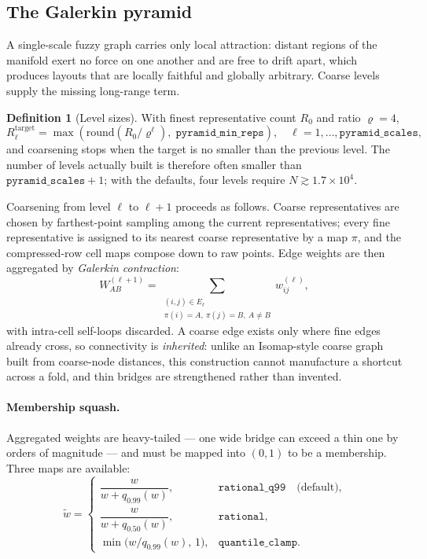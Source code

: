 \documentclass[12pt]{iopart}
\theoremstyle{definition}
\newtheorem{definition}{Definition}
\theoremstyle{plain}
\theoremstyle{remark}
\newcommand{\code}[1]{\texttt{#1}}
\begin{document}
\subsection{The Galerkin pyramid}
\label{sec:pyramid}

A single-scale fuzzy graph carries only local attraction: distant regions of the
manifold exert no force on one another and are free to drift apart, which
produces layouts that are locally faithful and globally arbitrary. Coarse
levels supply the missing long-range term.

\begin{definition}[Level sizes]
With finest representative count $R_0$ and ratio $\varrho=4$,
\[
R_\ell^{\mathrm{target}}
=
\max\!\left(\mathrm{round}\!\left(R_0/\varrho^{\ell}\right),\;
\code{pyramid\_min\_reps}\right),
\quad \ell=1,\ldots,\code{pyramid\_scales},
\]
and coarsening stops when the target is no smaller than the previous level. The
number of levels actually built is therefore often smaller than
$\code{pyramid\_scales}+1$; with the defaults, four levels require
$N\gtrsim 1.7\times 10^4$.
\end{definition}

Coarsening from level $\ell$ to $\ell{+}1$ proceeds as follows. Coarse
representatives are chosen by farthest-point sampling among the current
representatives; every fine representative is assigned to its nearest coarse
representative by a map $\pi$, and the compressed-row cell maps compose down to
raw points. Edge weights are then aggregated by \emph{Galerkin contraction}:
\begin{equation}
\label{eq:galerkin}
W^{(\ell+1)}_{AB}
=
\sum_{\substack{(i,j)\in E_\ell \\ \pi(i)=A,\ \pi(j)=B,\ A\neq B}}
w^{(\ell)}_{ij},
\end{equation}
with intra-cell self-loops discarded. A coarse edge exists only where fine
edges already cross, so connectivity is \emph{inherited}: unlike an Isomap-style
coarse graph built from coarse-node distances, this construction cannot
manufacture a shortcut across a fold, and thin bridges are strengthened rather
than invented.

\paragraph{Membership squash.}
Aggregated weights are heavy-tailed --- one wide bridge can exceed a thin one
by orders of magnitude --- and must be mapped into $(0,1)$ to be a membership.
Three maps are available:
\begin{equation}
\label{eq:squash}
\tilde w
=
\begin{cases}
\dfrac{w}{w+q_{0.99}(w)}, & \code{rational\_q99}\quad\text{(default)},\\[10pt]
\dfrac{w}{w+q_{0.50}(w)}, & \code{rational},\\[10pt]
\min\!\bigl(w/q_{0.99}(w),\,1\bigr), & \code{quantile\_clamp}.
\end{cases}
\end{equation}
\end{document}
